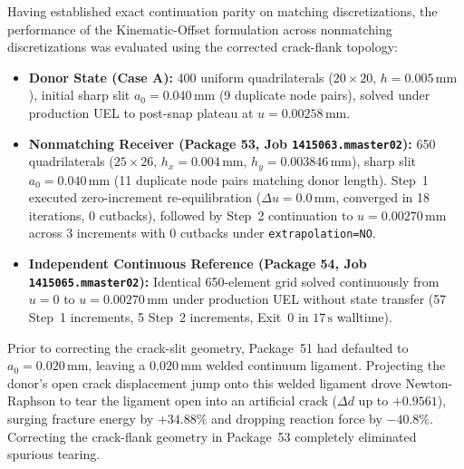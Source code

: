 Having established exact continuation parity on matching discretizations, the performance of the Kinematic-Offset formulation across nonmatching discretizations was evaluated using the corrected crack-flank topology:
\begin{itemize}
  \item \textbf{Donor State (Case A):} 400 uniform quadrilaterals ($20 \times 20$, $h = 0.005\,\mathrm{mm}$), initial sharp slit $a_0 = 0.040\,\mathrm{mm}$ (9 duplicate node pairs), solved under production UEL to post-snap plateau at $u = 0.00258\,\mathrm{mm}$.
  \item \textbf{Nonmatching Receiver (Package 53, Job \texttt{1415063.mmaster02}):} 650 quadrilaterals ($25 \times 26$, $h_x = 0.004\,\mathrm{mm}$, $h_y = 0.003846\,\mathrm{mm}$), sharp slit $a_0 = 0.040\,\mathrm{mm}$ (11 duplicate node pairs matching donor length). Step~1 executed zero-increment re-equilibration ($\Delta u = 0.0\,\mathrm{mm}$, converged in 18 iterations, 0 cutbacks), followed by Step~2 continuation to $u = 0.00270\,\mathrm{mm}$ across 3 increments with 0 cutbacks under \texttt{extrapolation=NO}.
  \item \textbf{Independent Continuous Reference (Package 54, Job \texttt{1415065.mmaster02}):} Identical 650-element grid solved continuously from $u = 0$ to $u = 0.00270\,\mathrm{mm}$ under production UEL without state transfer (57 Step~1 increments, 5 Step~2 increments, Exit~0 in $17\,\mathrm{s}$ walltime).
\end{itemize}

Prior to correcting the crack-slit geometry, Package~51 had defaulted to $a_0 = 0.020\,\mathrm{mm}$, leaving a $0.020\,\mathrm{mm}$ welded continuum ligament. Projecting the donor's open crack displacement jump onto this welded ligament drove Newton-Raphson to tear the ligament open into an artificial crack ($\Delta d$ up to $+0.9561$), surging fracture energy by $+34.88\%$ and dropping reaction force by $-40.8\%$. Correcting the crack-flank geometry in Package~53 completely eliminated spurious tearing.

